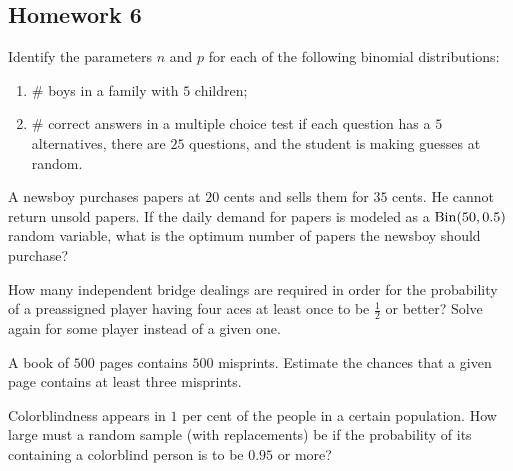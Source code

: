 \subsection{Homework 6}
\begin{problem}[Handout 8, \# 2]
  Identify the parameters \(n\) and \(p\) for each of the following
  binomial distributions:
  \begin{enumerate}[label=(\alph*),noitemsep]
  \item \(\#\) boys in a family with \(5\) children;
  \item \(\#\) correct answers in a multiple choice test if each
    question has a \(5\) alternatives, there are \(25\) questions, and the
    student is making guesses at random.
  \end{enumerate}
\end{problem}
\begin{solution}
\end{solution}

\begin{problem}[Handout 8, \# 10]
  A newsboy purchases papers at \(20\) cents and sells them for \(35\)
  cents. He cannot return unsold papers. If the daily demand for papers is
  modeled as a \(\operatorname{Bin}(50,0.5)\) random variable, what is the optimum
  number of papers the newsboy should purchase?
\end{problem}
\begin{solution}
\end{solution}

\begin{problem}[Handout 8, \# 12]
  How many independent bridge dealings are required in order for the
  probability of a preassigned player having four aces at least once to be
  \(\frac{1}{2}\) or better? Solve again for some player instead of a given
  one.
\end{problem}
\begin{solution}
\end{solution}

\begin{problem}[Handout 8, \# 13]
  A book of \(500\) pages contains \(500\) misprints. Estimate the chances
  that a given page contains at least three misprints.
\end{problem}
\begin{solution}
\end{solution}


\begin{problem}[Handout 8, \# 14]
  Colorblindness appears in \(1\) per cent of the people in a certain
  population. How large must a random sample (with replacements) be if the
  probability of its containing a colorblind person is to be \(0.95\) or more?
\end{problem}
\begin{solution}
\end{solution}

